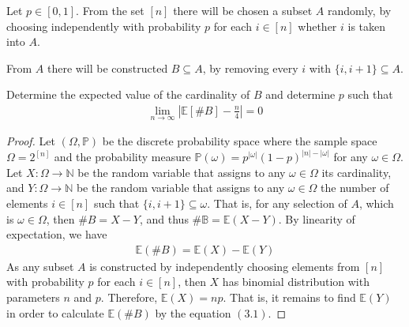 \begin{problem}
  Let $p \in [0,1]$. From the set $[n]$ there will be chosen a subset $A$ randomly, by choosing independently with probability $p$ for each $i \in [n]$ whether $i$ is taken into $A$.

   From $A$ there will be constructed $B \subseteq A$, by removing every $i$ with $\{i,i+1\} \subseteq A$.

   Determine the expected value of the cardinality of $B$ and determine $p$ such that
   \begin{align*}
     \lim_{n \to \infty} | \mathbb{E}[\#B] - \frac{n}{4} | = 0
   \end{align*}
\end{problem}
\begin{proof}
  Let $(\Omega, \mathbb{P})$ be the discrete probability space where the sample space $\Omega = 2^{[n]}$ and the probability measure $\mathbb{P}(\omega) = p^{|\omega|}(1-p)^{|n| - |\omega|}$ for any $\omega \in \Omega$. Let $X : \Omega \to \mathbb{N}$ be the random variable that assigns to any $\omega \in \Omega$ its cardinality, and $Y : \Omega \to \mathbb{N}$ be the random variable that assigns to any $\omega \in \Omega$ the number of elements $i \in [n]$ such that $\{i,i+1\} \subseteq \omega$. That is, for any selection of $A$, which is $\omega \in \Omega$, then $\# B = X - Y$, and thus $\mathbb{\# B} = \mathbb{E}(X-Y)$. By linearity of expectation, we have
  \begin{align*}
    \mathbb{E}(\# B) = \mathbb{E}(X) - \mathbb{E}(Y) \tag{3.1}
  \end{align*}
  As any subset $A$ is constructed by independently choosing elements from $[n]$ with probability $p$ for each $i \in [n]$, then $X$ has binomial distribution with parameters $n$ and $p$. Therefore, $\mathbb{E}(X) = np$. That is, it remains to find $\mathbb{E}(Y)$ in order to calculate $\mathbb{E}(\# B)$ by the equation $(3.1)$.


\end{proof}
